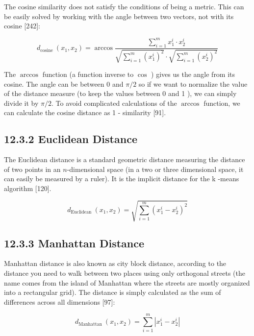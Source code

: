 \documentclass[10pt]{book}
\begin{document}
The cosine similarity does not satisfy the conditions of being a metric. This can be easily solved by working with the angle between two vectors, not with its cosine [242]:


\begin{equation*}
d_{\text {cosine }}\left(x_{1}, x_{2}\right)=\arccos \frac{\sum_{i=1}^{m} x_{1}^{i} \cdot x_{2}^{i}}{\sqrt{\sum_{i=1}^{m}\left(x_{1}^{i}\right)^{2}} \cdot \sqrt{\sum_{i=1}^{m}\left(x_{2}^{i}\right)^{2}}} \tag{12.6}
\end{equation*}


The $\arccos$ function (a function inverse to $\cos$ ) gives us the angle from its cosine. The angle can be between 0 and $\pi / 2$ so if we want to normalize the value of the distance measure (to keep the values between 0 and 1 ), we can simply divide it by $\pi / 2$. To avoid complicated calculations of the $\arccos$ function, we can calculate the cosine distance as 1 - similarity [91].

\subsection*{12.3.2 Euclidean Distance}
The Euclidean distance is a standard geometric distance measuring the distance of two points in an $n$-dimensional space (in a two or three dimensional space, it can easily be measured by a ruler). It is the implicit distance for the k -means algorithm [120].


\begin{equation*}
d_{\text {Euclidean }}\left(x_{1}, x_{2}\right)=\sqrt{\sum_{i=1}^{m}\left(x_{1}^{i}-x_{2}^{i}\right)^{2}} \tag{12.7}
\end{equation*}


\subsection*{12.3.3 Manhattan Distance}
Manhattan distance is also known as city block distance, according to the distance you need to walk between two places using only orthogonal streets (the name comes from the island of Manhattan where the streets are mostly organized into a rectangular grid). The distance is simply calculated as the sum of differences across all dimensions [97]:


\begin{equation*}
d_{\text {Manhattan }}\left(x_{1}, x_{2}\right)=\sum_{i=1}^{m}\left|x_{1}^{i}-x_{2}^{i}\right| \tag{12.8}
\end{equation*}
\end{document}
